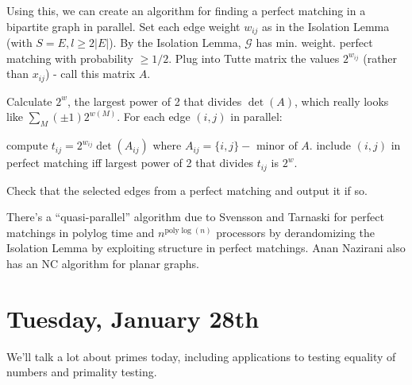 \documentclass[11 pt]{scrartcl}
\begin{document}
Using this, we can create an algorithm for finding a perfect matching in a bipartite graph in parallel. 
\alphanum
    \ii Set each edge weight $w_{ij}$ as in the Isolation Lemma (with $S = E, l \geq 2|E|$). 
    \ii By the Isolation Lemma, $\mathcal{G}$ has min. weight. perfect matching with probability $\geq 1/2$.
    \ii Plug into Tutte matrix the values $2^{w_{ij}}$ (rather than $x_{ij}$) - call this matrix $A$. 
    \begin{itemize}
        \ii Calculate $2^w$, the largest power of 2 that divides $\det(A)$, which really looks like $\sum_M (\pm 1) 2^{w(M)}$. 
        \ii For each edge $(i,j)$ in parallel: 
            \begin{enumerate}[-]
                \ii compute $t_{ij} = 2^{w_{ij}}\det(A_{ij})$ where $A_{ij} = \{i,j\} - \text{ minor of }A$. 
                \ii include $(i,j)$ in perfect matching iff largest power of 2 that divides $t_{ij}$ is $2^w$.
            \end{enumerate}
        \ii Check that the selected edges from a perfect matching and output it if so. 
    \end{itemize}
\enumend

There's a ``quasi-parallel'' algorithm due to Svensson and Tarnaski for perfect matchings in polylog time and $n^{\text{poly}\log(n)}$ processors by derandomizing the Isolation Lemma by exploiting structure in perfect matchings. Anan Nazirani also has an NC algorithm for planar graphs. 

\newpage
\section{Tuesday, January 28th}
We'll talk a lot about primes today, including applications to testing equality of numbers and primality testing. 
\end{document}
